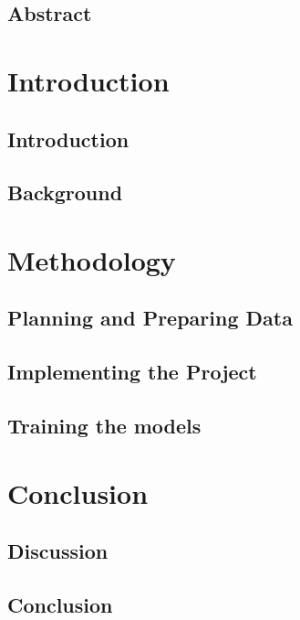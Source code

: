 \documentclass[UKenglish]{ifimaster}
\title{\problemStatement}
\subtitle{
}
\author{Joakim I. Frogner}
\begin{document}
\duoforside[dept={Department of Informatics},
program={Programming and Networks},
long]

\frontmatter{}
\chapter*{Abstract}

\tableofcontents{} 
\listoffigures{}
\listoftables{}

\mainmatter{}
\part{Introduction}

\chapter{Introduction}


\chapter{Background}



\part{Methodology}
\chapter{Planning and Preparing Data}


\chapter{Implementing the Project}


\chapter{Training the models}


\part{Conclusion}
\chapter{Discussion}


\chapter{Conclusion}


\backmatter{}
\printbibliography
\end{document}
